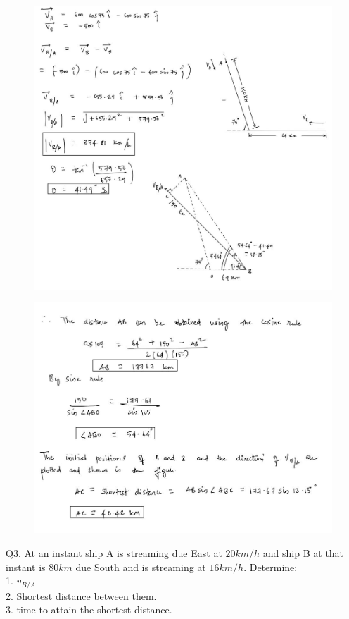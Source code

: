 \documentclass[11pt]{article}
\begin{document}
\begin{figure}[H]
	\includegraphics[scale=0.5]{g222.jpg}
	\label{fig: Polygon Law}
\end{figure}


\begin{figure}[H]
	\includegraphics[scale=0.5]{g22.jpg}
	\label{fig: Polygon Law}
\end{figure}

\pagebreak

Q3. At an instant ship A is streaming due East at $  20 km/h $ and ship B at that instant is $ 80 km $ due South and is streaming at $ 16 km/h $. Determine: \\
1. $ v_{B/A} $\\
2. Shortest distance between them.\\
3. time to attain the shortest distance.
\end{document}
